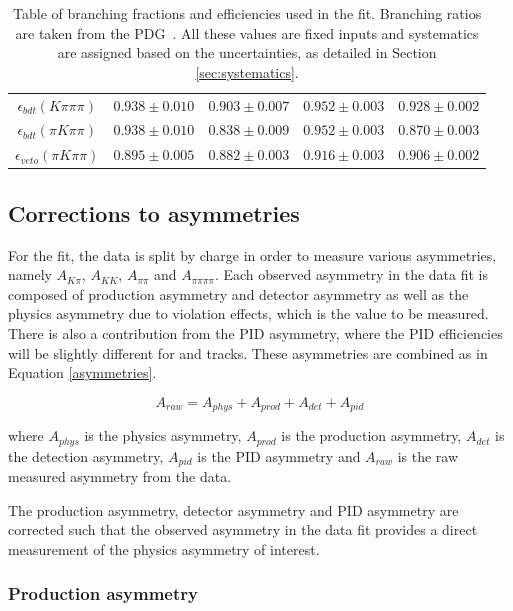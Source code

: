\begin{table}[h]
\begin{tabular}{c|cc|cc}
$\epsilon_{bdt}(K\pi\pi\pi)$ & $0.938 \pm 0.010$ & $0.903 \pm 0.007$ & $0.952 \pm 0.003$ & $0.928 \pm 0.002$ \\
$\epsilon_{bdt}(\pi K\pi\pi)$ & $0.938 \pm 0.010$ & $0.838 \pm 0.009$ & $0.952 \pm 0.003$ & $0.870 \pm 0.003$ \\
$\epsilon_{veto}(\pi K \pi\pi)$ & $0.895 \pm 0.005$ & $0.882 \pm 0.003$ & $0.916 \pm 0.003$ & $0.906 \pm 0.002$ \\
\hline
\end{tabular}
\caption{Table of branching fractions and efficiencies used in the \CP fit. Branching ratios are taken from the PDG~\cite{PDG2016}. All these values are fixed inputs and systematics are assigned based on the uncertainties, as detailed in Section \ref{sec:systematics}.}
\label{fitinputs}
\end{table}




\subsection{Corrections to asymmetries}
\label{sec:cpfit:asymmetries}

For the \CP fit, the data is split by charge in order to measure various asymmetries, namely $A_{K\pi}$, $A_{KK}$, $A_{\pi\pi}$ and $A_{\pi\pi\pi\pi}$. Each observed asymmetry in the data fit is composed of \Bpm production asymmetry and detector asymmetry as well as the physics asymmetry due to \CP violation effects, which is the value to be measured. There is also a contribution from the PID asymmetry, where the PID efficiencies will be slightly different for \Bp and \Bm tracks. These asymmetries are combined as in Equation \ref{asymmetries}.

\begin{equation}
A_{raw} = A_{phys} + A_{prod} + A_{det} + A_{pid}
\label{asymmetries}
\end{equation} 

where $A_{phys}$ is the physics \CP asymmetry, $A_{prod}$ is the production asymmetry, $A_{det}$ is the detection asymmetry, $A_{pid}$ is the PID asymmetry and $A_{raw}$ is the raw measured asymmetry from the data.

The production asymmetry, detector asymmetry and PID asymmetry are corrected such that the observed asymmetry in the data fit provides a direct measurement of the physics asymmetry of interest.

\subsubsection{Production asymmetry}

